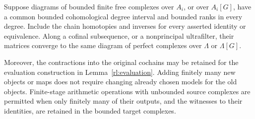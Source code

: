 \begin{lemma}\label{rl:finite-limits}
Suppose diagrams of bounded finite free complexes over $A_i$, or
over $A_i[G]$, have a common bounded cohomological degree interval
and bounded ranks in every degree. Include the chain homotopies
and inverses for every asserted identity or equivalence. Along a
cofinal subsequence, or a nonprincipal ultrafilter, their matrices
converge to the same diagram of perfect complexes over $\Lambda$
or $\Lambda[G]$.

Moreover, the contractions into the original cochains may be retained for
the evaluation construction in Lemma~\ref{rl:evaluation}.  Adding finitely
many new objects or maps does not require changing already chosen models
for the old objects. Finite-stage arithmetic operations with unbounded
source complexes are permitted when only finitely many of their outputs,
and the witnesses to their identities, are retained in the bounded
target complexes.
\end{lemma}


